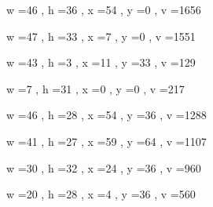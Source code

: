 \documentclass[11pt]{article}
\begin{document}
w =46 , h =36 , x =54 , y =0 , v =1656
\par
w =47 , h =33 , x =7 , y =0 , v =1551
\par
w =43 , h =3 , x =11 , y =33 , v =129
\par
w =7 , h =31 , x =0 , y =0 , v =217
\par
w =46 , h =28 , x =54 , y =36 , v =1288
\par
w =41 , h =27 , x =59 , y =64 , v =1107
\par
w =30 , h =32 , x =24 , y =36 , v =960
\par
w =20 , h =28 , x =4 , y =36 , v =560
\par
\newpage
\end{document}
